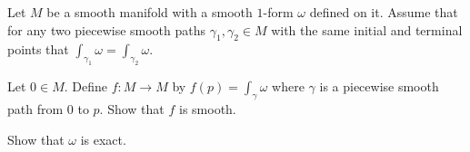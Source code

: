 Let $M$ be a smooth manifold with a smooth $1$-form $\omega$ defined
on it. Assume that for any two piecewise smooth paths
$\gamma_1,\gamma_2\in M$ with the same initial and terminal points
that $\int_{\gamma_1}\omega=\int_{\gamma_2}\omega$.
\begin{alist}
\item Let $0\in M$. Define $f:M\rightarrow M$ by
$f(p)=\int_{\gamma}\omega$ where $\gamma$ is a piecewise smooth path
from $0$ to $p$. Show that $f$ is smooth.
\item Show that $\omega$ is exact.
\end{alist}
